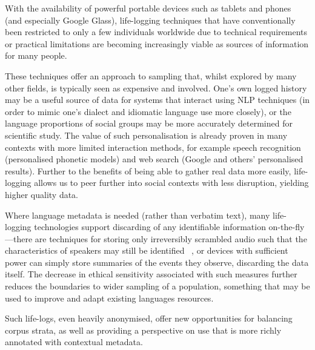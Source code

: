 With the availability of powerful portable devices such as tablets and phones (and especially Google Glass), life-logging techniques that have conventionally been restricted to only a few individuals worldwide due to technical requirements or practical limitations are becoming increasingly viable as sources of information for many people.

These techniques offer an approach to sampling that, whilst explored by many other fields, is typically seen as expensive and involved.  One's own logged history may be a useful source of data for systems that interact using NLP techniques (in order to mimic one's dialect and idiomatic language use more closely), or the language proportions of social groups may be more accurately determined for scientific study.  The value of such personalisation is already proven in many contexts with more limited interaction methods, for example speech recognition (personalised phonetic models) and web search (Google and others' personalised results).  Further to the benefits of being able to gather real data more easily, life-logging allows us to peer further into social contexts with less disruption, yielding higher quality data.

Where language metadata is needed (rather than verbatim text), many life-logging technologies support discarding of any identifiable information on-the-fly---there are techniques for storing only irreversibly scrambled audio such that the characteristics of speakers may still be identified
~\cite{lee2006voice}, or devices with sufficient power can simply store summaries of the events they observe, discarding the data itself.
The decrease in ethical sensitivity associated with such measures further reduces the boundaries to wider sampling of a population, something that may be used to improve and adapt existing languages resources.



Such life-logs, even heavily anonymised, offer new opportunities for balancing corpus strata, as well as providing a perspective on use that is more richly annotated with contextual metadata.





